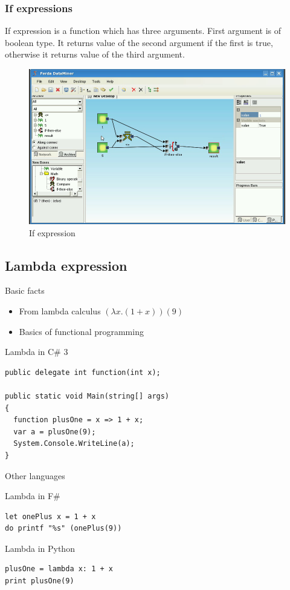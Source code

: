 \documentclass[a4paper,12pt]{book}
\begin{document}
\subsubsection{If expressions}
If expression is a function which has three arguments. First argument is of boolean type. It returns value of the second argument if the first is true, otherwise it returns value of the third argument.
\begin{figure}
\includegraphics[width=12cm]{ifthenelse2.png}
	\caption{If expression}
\end{figure}

\subsection{Lambda expression}
Basic facts
\begin{itemize}
	\item From lambda calculus $(\lambda x.(1+x))(9)$
	\item Basics of functional programming
\end{itemize}

Lambda in C\# 3
\begin{verbatim}
public delegate int function(int x);

public static void Main(string[] args)
{
  function plusOne = x => 1 + x;
  var a = plusOne(9);
  System.Console.WriteLine(a);
}
\end{verbatim}
	
Other languages

Lambda in F\#
\begin{verbatim}
let onePlus x = 1 + x
do printf "%s" (onePlus(9)) 
\end{verbatim}

Lambda in Python
\begin{verbatim}
plusOne = lambda x: 1 + x
print plusOne(9)
\end{verbatim}
\end{document}
